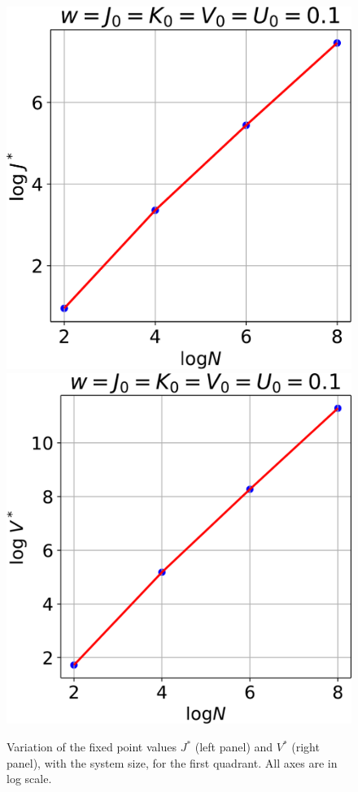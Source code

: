 \documentclass[12pt,twoside]{article}
\numberwithin{equation}{section}
\begin{document}
\begin{figure}[htpb!]
\centering
\includegraphics[scale=0.37]{../figures/J_vs_D.pdf}
\includegraphics[scale=0.37]{../figures/V_vs_D.pdf}
\caption{Variation of the fixed point values $J^*$ (left panel) and \(V^*\) (right panel), with the system size, for the first quadrant. All axes are in log scale.}
\label{frac_D}
\end{figure}
\end{document}
